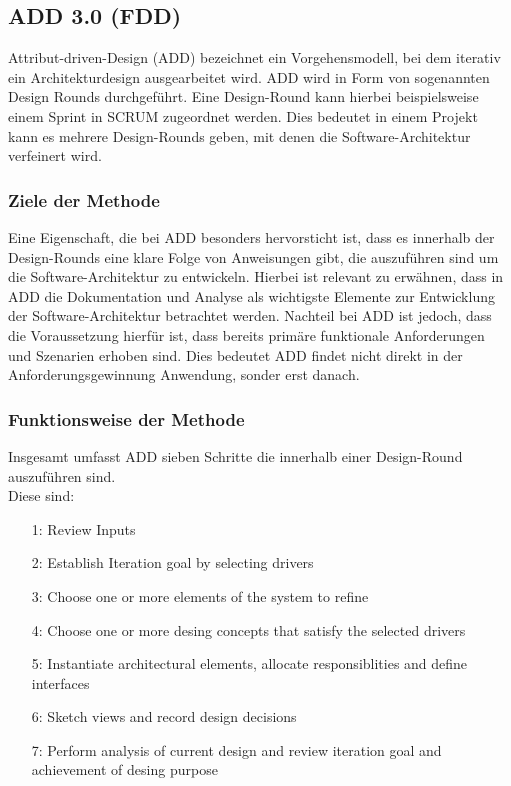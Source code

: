 \subsection{ADD 3.0 (FDD)}\label{add3}
Attribut-driven-Design (ADD) bezeichnet ein Vorgehensmodell, bei dem iterativ ein Architekturdesign ausgearbeitet wird. ADD wird in Form von sogenannten Design Rounds durchgeführt. Eine Design-Round kann hierbei beispielsweise einem Sprint in SCRUM zugeordnet werden. Dies bedeutet in einem Projekt kann es mehrere Design-Rounds geben, mit denen die Software-Architektur verfeinert wird. \\

\subsubsection{Ziele der Methode}
Eine Eigenschaft, die bei ADD besonders hervorsticht ist, dass es innerhalb der Design-Rounds eine klare Folge von Anweisungen gibt, die auszuführen sind um die Software-Architektur zu entwickeln. Hierbei ist relevant zu erwähnen, dass in ADD die Dokumentation und Analyse als wichtigste Elemente zur Entwicklung der Software-Architektur betrachtet werden. Nachteil bei ADD ist jedoch, dass die Voraussetzung hierfür ist, dass bereits primäre funktionale Anforderungen und Szenarien erhoben sind. Dies bedeutet ADD findet nicht direkt in der Anforderungsgewinnung Anwendung, sonder erst danach. \\

\subsubsection{Funktionsweise der Methode}
Insgesamt umfasst ADD sieben Schritte die innerhalb einer Design-Round auszuführen sind.\\

Diese sind:
\begin{itemize}
\item[1:] Review Inputs
\item[2:] Establish Iteration goal by selecting drivers
\item[3:] Choose one or more elements of the system to refine
\item[4:] Choose one or more desing concepts that satisfy the selected drivers
\item[5:] Instantiate architectural elements, allocate responsiblities and define interfaces
\item[6:] Sketch views and record design decisions
\item[7:] Perform analysis of current design and review iteration goal and achievement of desing purpose\\
\end{itemize}

